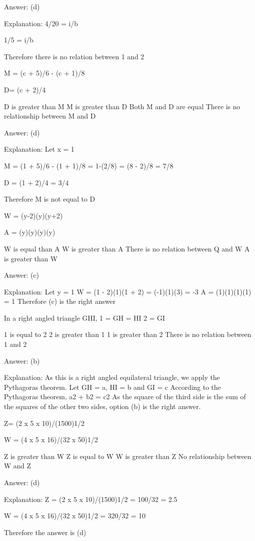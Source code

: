     Answer: (d)

    Explanation: 4/20 = i/b

    1/5 = i/b

    Therefore there is no relation between 1 and 2

    M = {(c + 5)/6} - {(c + 1)/8}

    D= (c + 2)/4

        D is greater than M
        M is greater than D
        Both M and D are equal
        There is no relationship between M and D

    Answer:  (d)

    Explanation: Let x = 1

    M = {(1 + 5)/6} - {(1 + 1)/8} = 1-(2/8) = (8 - 2)/8 = 7/8

    D = (1 + 2)/4 = 3/4

    Therefore M is not equal to D

    W = (y-2)(y)(y+2)

    A = (y)(y)(y)(y)

        W is equal than A
        W is greater than A
        There is no relation between Q and W
        A is greater than W

    Answer: (c)

    Explanation: Let y = 1 W = (1 - 2)(1)(1 + 2) = (-1)(1)(3) = -3 A = (1)(1)(1)(1) = 1 Therefore (c) is the right answer

    In a right angled triangle GHI, 1 = GH = HI 2 = GI

        1 is equal to 2
        2 is greater than 1
        1 is greater than 2
        There is no relation between 1 and 2

    Answer: (b)

    Explanation: As this is a right angled equilateral triangle, we apply the Pythagoras theorem.
    Let GH = a, HI = b and GI = c
    According to the Pythagoras theorem, a2 + b2 = c2
    As the square of the third side is the sum of the squares of the other two sides, option (b) is the right answer.

    Z= (2 x 5 x 10)/(1500)1/2

    W = (4 x 5 x 16)/(32 x 50)1/2

        Z is greater than W
        Z is equal to W
        W is greater than Z
        No relationship between W and Z

    Answer: (d)

    Explanation:  Z = (2 x 5 x 10)/(1500)1/2 = 100/32 = 2.5

    W = (4 x 5 x 16)/(32 x 50)1/2 = 320/32 = 10

    Therefore the answer is (d) 


